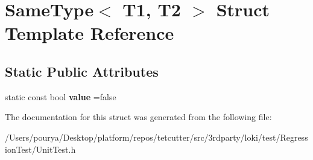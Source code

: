 \hypertarget{structSameType}{}\section{Same\+Type$<$ T1, T2 $>$ Struct Template Reference}
\label{structSameType}
\subsection*{Static Public Attributes}
\begin{DoxyCompactItemize}
\item 
\hypertarget{structSameType_af6404b24c052c9ea97b43bbe32706b4a}{}static const bool {\bfseries value} =false\label{structSameType_af6404b24c052c9ea97b43bbe32706b4a}

\end{DoxyCompactItemize}


The documentation for this struct was generated from the following file\+:\begin{DoxyCompactItemize}
\item 
/\+Users/pourya/\+Desktop/platform/repos/tetcutter/src/3rdparty/loki/test/\+Regression\+Test/Unit\+Test.\+h\end{DoxyCompactItemize}
